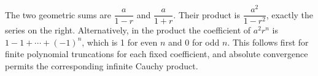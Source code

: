 The two geometric sums are $\dfrac{a}{1-r}$ and $\dfrac{a}{1+r}$. Their product is $\dfrac{a^2}{1-r^2}$, exactly the series on the right. Alternatively, in the product the coefficient of $a^2r^n$ is $1-1+\cdots+(-1)^n$, which is 1 for even $n$ and 0 for odd $n$. This follows first for finite polynomial truncations for each fixed coefficient, and absolute convergence permits the corresponding infinite Cauchy product.

